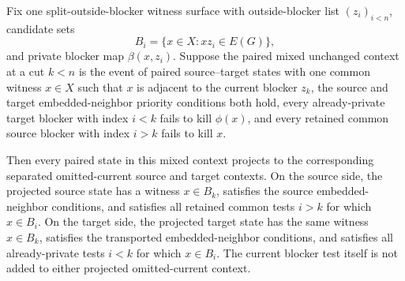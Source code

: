 \begin{helper}
Fix one split-outside-blocker witness surface with outside-blocker list
\((z_i)_{i<n}\), candidate sets
\[
  B_i=\{x\in X:xz_i\in E(G)\},
\]
and private blocker map \(\beta(x,z_i)\).  Suppose the paired mixed
unchanged context at a cut \(k<n\) is the event of paired source--target
states with one common witness \(x\in X\) such that \(x\) is adjacent to the
current blocker \(z_k\), the source and target embedded-neighbor priority
conditions both hold, every already-private target blocker with index
\(i<k\) fails to kill \(\phi(x)\), and every retained common source blocker
with index \(i>k\) fails to kill \(x\).

Then every paired state in this mixed context projects to the corresponding
separated omitted-current source and target contexts.  On the source side,
the projected source state has a witness \(x\in B_k\), satisfies the source
embedded-neighbor conditions, and satisfies all retained common tests
\(i>k\) for which \(x\in B_i\).  On the target side, the projected target
state has the same witness \(x\in B_k\), satisfies the transported
embedded-neighbor conditions, and satisfies all already-private tests
\(i<k\) for which \(x\in B_i\).  The current blocker test itself is not added
to either projected omitted-current context.
\end{helper}

